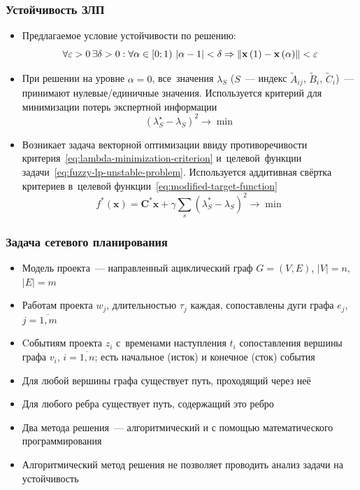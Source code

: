 \documentclass[12pt]{beamer}
\begin{document}
\begin{frame}
  \frametitle{Устойчивость ЗЛП}
  \begin{itemize}
    \item Предлагаемое условие устойчивости по решению:
      \begin{equation}
      \label{eq:fuzzy-solution-stability}
        \forall \varepsilon >0\, \exists \delta >0:\forall \alpha \in \left[0; 1\right)\,\left| \alpha -1 \right|<\delta \linebreak \Rightarrow \left\| \mathbf{x}\left( 1 \right)-\mathbf{x}\left( \alpha  \right) \right\|<\varepsilon
      \end{equation}
      
    \item При решении на уровне $\alpha=0$, все~значения $\lambda_S$ ($S$~--- индекс $\tilde A_{ij}$, $\tilde B_i$, $\tilde C_i$)~--- принимают нулевые/единичные значения. Используется критерий для минимизации потерь экспертной информации
      \begin{equation}
      \label{eq:lambda-minimization-criterion}
        {\left( \lambda_{S}^{\star}-\lambda_S \right)}^2\to \min
      \end{equation}
    
    \item Возникает задача векторной оптимизации ввиду противоречивости критерия~\eqref{eq:lambda-minimization-criterion} и~целевой~функции задачи~\eqref{eq:fuzzy-lp-unstable-problem}. Используется аддитивная свёртка критериев в~целевой функции~\eqref{eq:modified-target-function}
      \begin{equation}
      \label{eq:modified-target-function}
        f^{*}\left( \mathbf{x} \right)=\mathbf{C}^{*}\mathbf{x}+\gamma \sum\limits_{s}^{}{\left(\lambda_{S}^{*}-\lambda_S \right)}^{2} \to \min
      \end{equation}
  \end{itemize}
\end{frame}

\begin{frame}
  \frametitle{Задача сетевого планирования}
  \begin{itemize}
    \item Модель проекта~--- направленный ациклический граф $G=(V,E)$, $\left| V \right|=n$, $\left| E \right|=m$
    \item Работам проекта $w_j$, длительностью $\tau_j$ каждая, сопоставлены дуги графа $e_j$, $j=\overline{1,m}$
    \item Cобытиям проекта $z_i$ с~временами наступления $t_i$ сопоставления вершины графа $v_i$, $i=\overline{1,n}$; есть начальное (исток) и конечное (сток) события
    \item Для любой вершины графа существует путь, проходящий через неё
    \item Для любого ребра существует путь, содержащий это ребро
    \item Два метода решения~--- алгоритмический и с помощью математического программирования
    \item Алгоритмический метод решения не позволяет проводить анализ задачи на устойчивость
  \end{itemize}
\end{frame}
\end{document}
